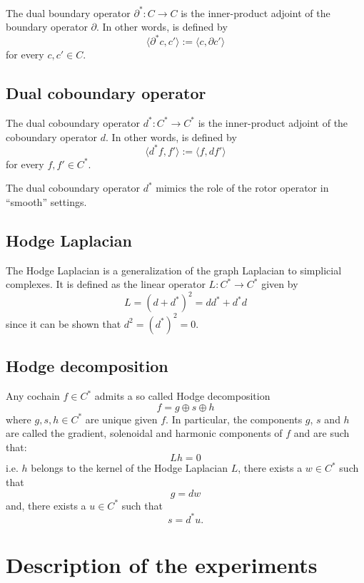 \documentclass[aps,prl,twocolumn,groupedaddress]{revtex4-2}
\begin{document}
The dual boundary operator $\partial^*:C\to C$ is the inner-product adjoint of the boundary operator $\partial$.
In other words, is defined by
$$
\langle \partial^* c , c' \rangle 
:=
\langle c ,  \partial c' \rangle 
$$
for every $c,c'\in C$.

\subsection{Dual coboundary operator}

The dual coboundary operator $d^*:C^*\to C^*$ is the inner-product adjoint of the coboundary operator $d$.
In other words, is defined by
$$
\langle d^* f , f' \rangle 
:=
\langle f ,  d f' \rangle 
$$
for every $f,f'\in C^*$.

The dual coboundary operator $d^*$ mimics the role of the rotor operator in ``smooth'' settings.

\subsection{Hodge Laplacian}

The Hodge Laplacian is a generalization of the graph Laplacian to simplicial complexes.
It is defined as the linear operator $L:C^*\to C^*$ given by
$$
L = (d+d^*)^2 = dd^* + d^*d
$$
since it can be shown that $d^2 = (d^*)^2 = 0$.

\subsection{Hodge decomposition}


Any cochain $f\in C^*$ admits a so called Hodge decomposition
$$
f
=
g\oplus s\oplus h
$$
where $g,s,h\in C^*$ are unique given $f$.
In particular, the components $g$, $s$ and $h$ are called the gradient, solenoidal and harmonic components of $f$ and are such that:
$$
Lh=0
$$
i.e. $h$ belongs to the kernel of the Hodge Laplacian $L$,
there exists a $w\in C^*$ such that 
$$
g=dw
$$ 
and, there exists a $u\in C^*$ such that 
$$
s=d^*u.
$$

\section{Description of the experiments}
\end{document}
